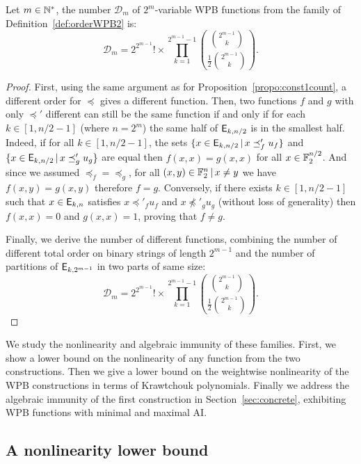 \documentclass[11pt]{llncs}
\begin{document}
\begin{proposition}\label{const2count}
	Let $m\in \mathbb{N}^*$, the number $\mathcal{D}_m$ of $2^m$-variable WPB functions from the family of Definition~\ref{def:orderWPB2} is: \[\mathcal{D}_m=2^{2^{m-1}}!  \times \prod_{k=1}^{2^{m-1}-1} \binom{\binom{2^{m-1}}{k}}{\frac{ 1}{2} \binom{2^{m-1}}{k}}.\]
	
\end{proposition}
\begin{proof}
First, using the same argument as for Proposition~\ref{propo:const1count}, a different order for $\preceq$ gives a different function. 
Then, two functions $f$ and $g$ with only $\preceq'$ different can still be the same function if and only if for each $k\in [1,n/2-1]$ (where $n=2^m$) the same half of $\mathsf{E}_{k,n/2}$ is in the smallest half. 
Indeed, if for all $k\in [1,n/2-1]$, the sets $\{x \in \mathsf{E}_{k,n/2}\, | \, x\preceq_f' u_f\}$ and $\{x \in \mathsf{E}_{k,n/2}\, | \, x\preceq_g' u_g\}$ are equal then $f(x,x)=g(x,x)$ for all $x\in \mathbb{F}_2^{n/2}$. 
And since we assumed $\preceq_f=\preceq_g$, for all $(x,y)\in \mathbb{F}_2^n \, | \, x\ne y$ we have $f(x,y)=g(x,y)$ therefore $f=g$. 
Conversely, if there exists $k\in [1,n/2-1]$ such that $x\in \mathsf{E}_{k,n}$ satisfies $x\preceq'_f u_f$ and $x \not \preceq'_g u_g$ (without loss of generality) then $f(x,x)=0$ and $g(x,x)=1$, proving that $f \ne g$.

Finally, we derive the number of different functions, combining the number of different total order on binary strings of length $2^{m-1}$ and the number of partitions of $\mathsf{E}_{k,2^{m-1}}$ in two parts of same size:
\[\mathcal{D}_m=2^{2^{m-1}}!  \times \prod_{k=1}^{2^{m-1}-1} \binom{\binom{2^{m-1}}{k}}{\frac{ 1}{2} \binom{2^{m-1}}{k}}.\]
	
	
\end{proof}



We study the nonlinearity and algebraic immunity of these families. First, we show a lower bound on the nonlinearity of any function from the two constructions. Then we give a lower bound on the weightwise nonlinearity of the WPB constructions in terms of Krawtchouk polynomials. 
Finally we address the algebraic immunity of the first construction in Section~\ref{sec:concrete}, exhibiting WPB functions with minimal and maximal AI.

\subsection{A nonlinearity lower bound}
\end{document}
